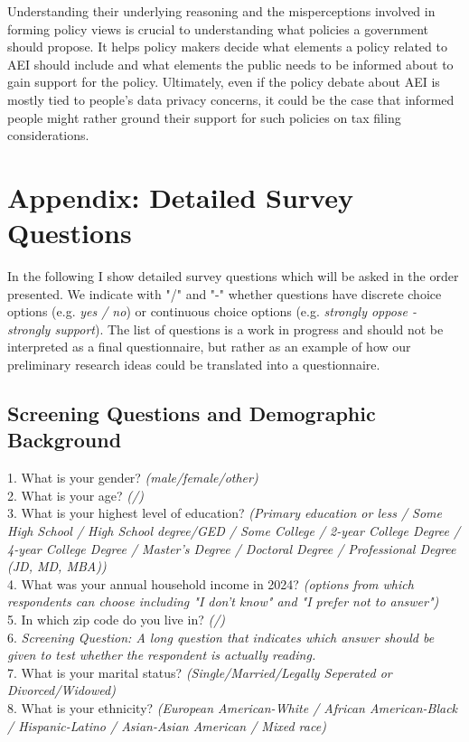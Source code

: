 \documentclass[11pt]{article}
\begin{document}
Understanding their underlying reasoning and the misperceptions involved in forming policy views is crucial to understanding what policies a government should propose. It helps policy makers decide what elements a policy related to AEI should include and what elements the public needs to be informed about to gain support for the policy. Ultimately, even if the policy debate about AEI is mostly tied to people's data privacy concerns, it could be the case that informed people might rather ground their support for such policies on tax filing considerations.

\newpage
\printbibliography
\newpage
\section*{Appendix: Detailed Survey Questions}
In the following I show detailed survey questions which will be asked in the order presented.  We indicate with "/" and "-" whether questions have discrete choice options (e.g. \textit{yes / no}) or continuous choice options (e.g. \textit{strongly oppose - strongly support}). The list of questions is a work in progress and should not be interpreted as a final questionnaire, but rather as an example of how our preliminary research ideas could be translated into a questionnaire. 
\subsection*{Screening Questions and Demographic Background}
1. What is your gender? \textit{(male/female/other)} \\[0.5em]
2. What is your age? \textit{(/)} \\[0.5em]
3. What is your highest level of education? \textit{(Primary education or less / Some High School / High School degree/GED / Some College / 2-year College Degree / 4-year College Degree / Master’s Degree / Doctoral Degree / Professional Degree (JD, MD, MBA))} \\[0.5em]
4. What was your annual household income in 2024? \textit{(options from which respondents can choose including "I don't know" and "I prefer not to answer")} \\[0.5em]
5. In which zip code do you live in? \textit{(/)} \\[0.5em]
6. \textit{Screening Question: A long question that indicates which answer should be given to test whether the respondent is actually reading.} \\[0.5em]
7. What is your marital status? \textit{(Single/Married/Legally Seperated or Divorced/Widowed)} \\[0.5em]
8. What is your ethnicity? \textit{(European American-White / African American-Black / Hispanic-Latino / Asian-Asian American / Mixed race)} 
\end{document}
